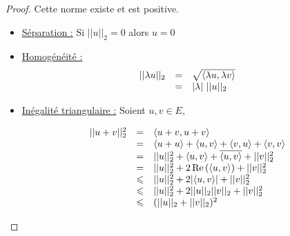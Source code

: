 \begin{proof}
    Cette norme existe et est positive. 

    \begin{itemize}
        \item \uline{Séparation :} Si $||u||_2 = 0$ alors $u=0$

        \item \uline{Homogénéité :}
        \[
            \begin{array}{rcl}
                || \lambda u ||_2 & = & \sqrt{\langle\lambda u, \lambda v \rangle} \\
                \space & = & |\lambda| ~ ||u||_2
            \end{array}
        \]

        \item \uline{Inégalité triangulaire :} Soient $u, v \in E$,

        \[
        \begin{array}{rcl}
            ||u + v||^2_2 & = & \langle u + v, u + v \rangle  \\
            \space & = & \langle u + u \rangle + \langle u, v \rangle + \langle v, u \rangle + \langle v, v \rangle \\
            \space & = & ||u||_2^2 + \langle u, v \rangle + \overline{\langle u, v \rangle} + ||v||_2^2  \\
            \space & =& ||u||_2^2 + 2 \operatorname{Re} \,(\langle u, v \rangle) + ||v||_2^2 \\
            \space & \leqslant & ||u||_2^2 + 2 |\langle u, v \rangle| + ||v||_2^2 \\
            \space & \leqslant & ||u||_2^2 + 2 ||u||_2 ||v||_2 + ||v||_2^2 \\
            \space & \leqslant & (||u||_2 + ||v||_2)^2 \\
        \end{array}
        \]
    \end{itemize}
\end{proof}

